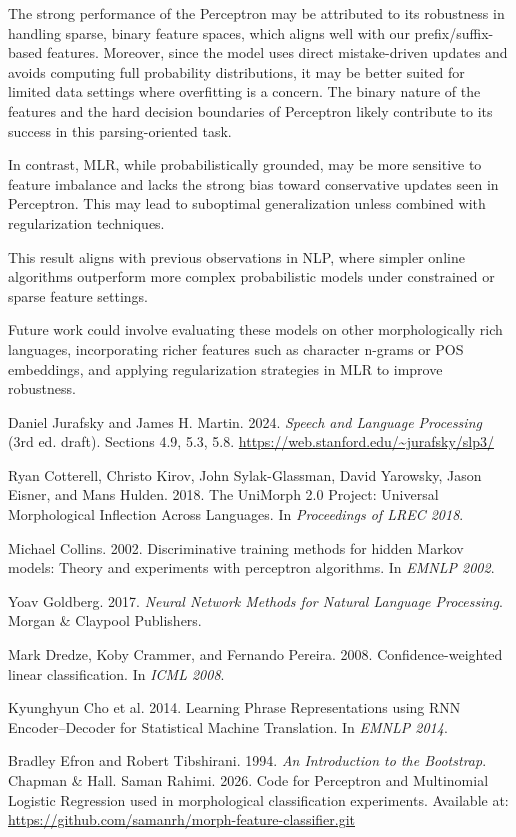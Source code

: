 \documentclass[11pt]{article}
\begin{document}
The strong performance of the Perceptron may be attributed to its robustness in handling sparse, binary feature spaces, which aligns well with our prefix/suffix-based features. Moreover, since the model uses direct mistake-driven updates and avoids computing full probability distributions, it may be better suited for limited data settings where overfitting is a concern. The binary nature of the features and the hard decision boundaries of Perceptron likely contribute to its success in this parsing-oriented task.

In contrast, MLR, while probabilistically grounded, may be more sensitive to feature imbalance and lacks the strong bias toward conservative updates seen in Perceptron. This may lead to suboptimal generalization unless combined with regularization techniques.

This result aligns with previous observations in NLP, where simpler online algorithms outperform more complex probabilistic models under constrained or sparse feature settings.

Future work could involve evaluating these models on other morphologically rich languages, incorporating richer features such as character n-grams or POS embeddings, and applying regularization strategies in MLR to improve robustness.


\clearpage

\begin{normalsize}
\begin{thebibliography}{9}

Daniel Jurafsky and James H. Martin. 2024. \textit{Speech and Language Processing} (3rd ed. draft). Sections 4.9, 5.3, 5.8. \url{https://web.stanford.edu/~jurafsky/slp3/}

Ryan Cotterell, Christo Kirov, John Sylak-Glassman, David Yarowsky, Jason Eisner, and Mans Hulden. 2018. The UniMorph 2.0 Project: Universal Morphological Inflection Across Languages. In \textit{Proceedings of LREC 2018}.

Michael Collins. 2002. Discriminative training methods for hidden Markov models: Theory and experiments with perceptron algorithms. In \textit{EMNLP 2002}.

Yoav Goldberg. 2017. \textit{Neural Network Methods for Natural Language Processing}. Morgan \& Claypool Publishers.

Mark Dredze, Koby Crammer, and Fernando Pereira. 2008. Confidence-weighted linear classification. In \textit{ICML 2008}.

Kyunghyun Cho et al. 2014. Learning Phrase Representations using RNN Encoder--Decoder for Statistical Machine Translation. In \textit{EMNLP 2014}.

Bradley Efron and Robert Tibshirani. 1994. \textit{An Introduction to the Bootstrap}. Chapman \& Hall.
Saman Rahimi. 2026. Code for Perceptron and Multinomial Logistic Regression used in morphological classification experiments. Available at: \url{https://github.com/samanrh/morph-feature-classifier.git}

\end{thebibliography}
\end{normalsize}
\end{document}
